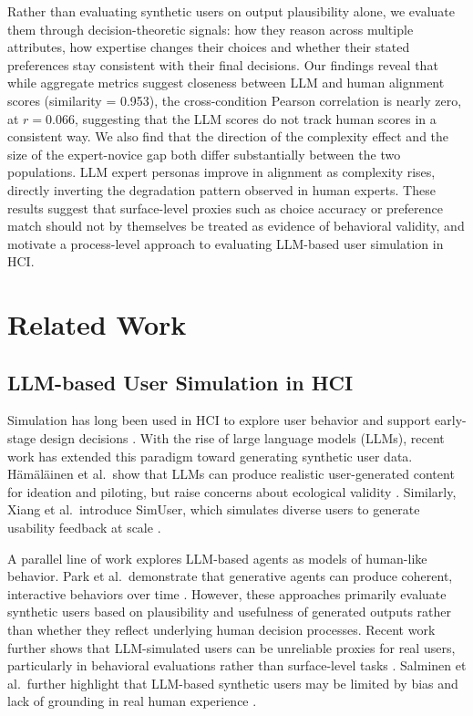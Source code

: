 \documentclass{sigchi-ext}
\begin{document}
Rather than evaluating synthetic users on output plausibility alone, we evaluate them through decision-theoretic signals: how they reason across multiple attributes, how expertise changes their choices and whether their stated preferences stay consistent with their final decisions. Our findings reveal that while aggregate metrics suggest closeness between LLM and human alignment scores (similarity = 0.953), the cross-condition Pearson correlation is nearly zero, at $r = 0.066$, suggesting that the LLM scores do not track human scores in a consistent way. We also find that the direction of the complexity effect and the size of the expert-novice gap both differ substantially between the two populations. LLM expert personas improve in alignment as complexity rises, directly inverting the degradation pattern observed in human experts. These results suggest that surface-level proxies such as choice accuracy or preference match should not by themselves be treated as evidence of behavioral validity, and motivate a process-level approach to evaluating LLM-based user simulation in HCI.

\section{Related Work}

\subsection{LLM-based User Simulation in HCI}

Simulation has long been used in HCI to explore user behavior and support early-stage design decisions \cite{murraysmith2022simulation}. With the rise of large language models (LLMs), recent work has extended this paradigm toward generating synthetic user data. H\"am\"al\"ainen et al.\ show that LLMs can produce realistic user-generated content for ideation and piloting, but raise concerns about ecological validity \cite{hamalainen2023synthetichci}. Similarly, Xiang et al.\ introduce SimUser, which simulates diverse users to generate usability feedback at scale \cite{xiang2024simuser}.

A parallel line of work explores LLM-based agents as models of human-like behavior. Park et al.\ demonstrate that generative agents can produce coherent, interactive behaviors over time \cite{park2023generativeagents}. However, these approaches primarily evaluate synthetic users based on plausibility and usefulness of generated outputs rather than whether they reflect underlying human decision processes. Recent work further shows that LLM-simulated users can be unreliable proxies for real users, particularly in behavioral evaluations rather than surface-level tasks \cite{lostinsimulation2024}. Salminen et al.\ further highlight that LLM-based synthetic users may be limited by bias and lack of grounding in real human experience \cite{salminen2025syntheticusers}.
\end{document}
